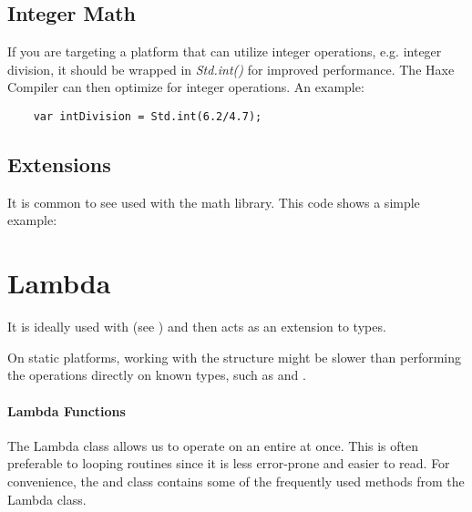 \subsection{Integer Math}
\label{std-math-integer-math}

If you are targeting a platform that can utilize integer operations, e.g. integer division, it should be wrapped in \emph{Std.int()} for improved performance.  The Haxe Compiler can then optimize for integer operations.  An example:

\begin{lstlisting}
	var intDivision = Std.int(6.2/4.7);
\end{lstlisting}


\subsection{Extensions}
\label{std-math-extensions}
It is common to see  used with the math library.  This code shows a simple example:  


\section{Lambda}
\label{std-Lambda}


It is ideally used with  (see ) and then acts as an extension to  types. 

On static platforms, working with the  structure might be slower than performing the operations directly on known types, such as  and .

\paragraph{Lambda Functions}
The Lambda class allows us to operate on an entire  at once.
This is often preferable to looping routines since it is less error-prone and easier to read. 
For convenience, the  and  class contains some of the frequently used methods from the Lambda class.

